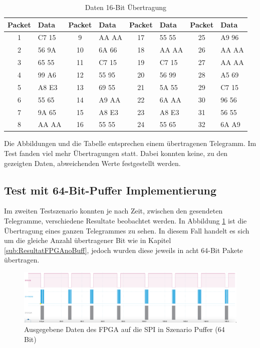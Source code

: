 \begin{table}[h!]
    \centering
    \begin{tabular}{cl||cl||cl||cl}
        \toprule
        \textbf{Packet} & \textbf{Data} & \textbf{Packet} & \textbf{Data} & \textbf{Packet} & \textbf{Data} & \textbf{Packet} & \textbf{Data} \\ 
        \midrule
        1  & C7 15 & 9  & AA AA & 17 & 55 55 & 25 & A9 96 \\
        2  & 56 9A & 10 & 6A 66 & 18 & AA AA & 26 & AA AA \\
        3  & 65 55 & 11 & C7 15 & 19 & C7 15 & 27 & AA AA \\
        4  & 99 A6 & 12 & 55 95 & 20 & 56 99 & 28 & A5 69 \\
        5  & A8 E3 & 13 & 69 55 & 21 & 5A 55 & 29 & C7 15 \\
        6  & 55 65 & 14 & A9 AA & 22 & 6A AA & 30 & 96 56 \\
        7  & 9A 65 & 15 & A8 E3 & 23 & A8 E3 & 31 & 56 55 \\
        8  & AA AA & 16 & 55 55 & 24 & 55 65 & 32 & 6A A9 \\
        \bottomrule
    \end{tabular}
    \caption{Daten 16-Bit Übertragung}
    \label{tab:packet_data}
\end{table}

Die Abbildungen und die Tabelle entsprechen einem übertragenen Telegramm. Im Test fanden viel mehr Übertragungen statt. Dabei konnten keine, zu den gezeigten Daten, abweichenden Werte festgestellt werden.

\subsection{Test mit 64-Bit-Puffer Implementierung}
\label{sub:ResultatFPGABuff}
Im zweiten Testszenario konnten je nach Zeit, zwischen den gesendeten Telegramme, verschiedene Resultate beobachtet werden. In Abbildung \ref{fig:ResultatFPGABuff} ist die Übertragung eines ganzen Telegrammes zu sehen. In diesem Fall handelt es sich um die gleiche Anzahl übertragener Bit wie in Kapitel \ref{sub:ResultatFPGAnoBuff}, jedoch wurden diese jeweils in acht 64-Bit Pakete übertragen.

\begin{figure}[H]
    \centering
    \includegraphics[width=1\linewidth]{Figures/Chap4/FPGA/Test_FPGA_Buff_signal.png}
    \caption{Ausgegebene Daten des FPGA auf die SPI in Szenario Puffer (64 Bit)}
    \label{fig:ResultatFPGABuff}
\end{figure}


